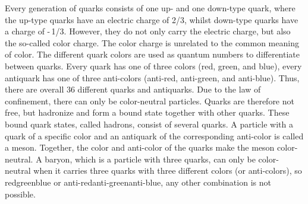 Every generation of quarks consists of one up- and one down-type quark, where the up-type quarks have an electric charge of 2/3, whilst down-type quarks have a charge of -\,1/3.
However, they do not only carry the electric charge, but also the so-called color charge.
The color charge is unrelated to the common meaning of color.
The different quark colors are used as quantum numbers to differentiate between quarks.
Every quark has one of three colors (red, green, and blue), every antiquark has one of three anti-colors (anti-red, anti-green, and anti-blue).
Thus, there are overall 36 different quarks and antiquarks.
Due to the law of confinement, there can only be color-neutral particles.
Quarks are therefore not free, but hadronize and form a bound state together with other quarks.
These bound quark states, called hadrons, consist of several quarks.
A particle with a quark of a specific color and an antiquark of the corresponding anti-color is called a meson.
Together, the color and anti-color of the quarks make the meson color-neutral.
A baryon, which is a particle with three quarks, can only be color-neutral when it carries three quarks with three different colors (or anti-colors), so red\textendash green\textendash blue or anti-red\textendash anti-green\textendash anti-blue, any other combination is not possible.

